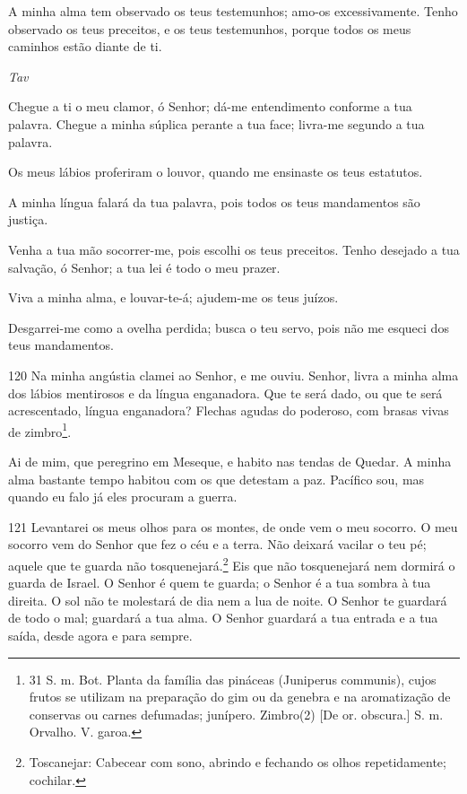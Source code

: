 A minha alma tem observado os teus testemunhos; amo-os
excessivamente. Tenho observado os teus preceitos, e os teus
testemunhos, porque todos os meus caminhos estão diante de ti.

\bigskip
\centerline{\emph{Tav}}

Chegue a ti o meu clamor, ó Senhor; dá-me entendimento conforme
a tua palavra. Chegue a minha súplica perante a tua face;
livra-me segundo a tua palavra.

Os meus lábios proferiram o louvor, quando me ensinaste os teus
estatutos.

A minha língua falará da tua palavra, pois todos os teus
mandamentos são justiça.

Venha a tua mão socorrer-me, pois escolhi os teus preceitos.
Tenho desejado a tua salvação, ó Senhor; a tua lei é todo o
meu prazer.

Viva a minha alma, e louvar-te-á; ajudem-me os teus juízos.

Desgarrei-me como a ovelha perdida; busca o teu servo, pois não
me esqueci dos teus mandamentos.

\bigskip

\lettrine{120}{} Na minha angústia clamei ao Senhor, e me ouviu.
Senhor, livra a minha alma dos lábios mentirosos e da língua
enganadora. Que te será dado, ou que te será acrescentado,
língua enganadora? Flechas agudas do poderoso, com brasas vivas
de zimbro\footnote{31 S. m. Bot. Planta da família das pináceas
(Juniperus communis), cujos frutos se utilizam na preparação do gim
ou da genebra e na aromatização de conservas ou carnes defumadas;
junípero. Zimbro(2) [De or. obscura.] S. m. Orvalho. V. garoa.}.

Ai de mim, que peregrino em Meseque, e habito nas tendas de
Quedar. A minha alma bastante tempo habitou com os que detestam
a paz. Pacífico sou, mas quando eu falo já eles procuram a
guerra.

\bigskip

\lettrine{121}{} Levantarei os meus olhos para os montes, de
onde vem o meu socorro. O meu socorro vem do Senhor que fez o
céu e a terra. Não deixará vacilar o teu pé; aquele que te
guarda não tosquenejará.\footnote{Toscanejar: Cabecear com sono,
abrindo e fechando os olhos repetidamente; cochilar.} Eis que
não tosquenejará nem dormirá o guarda de Israel. O Senhor é quem
te guarda; o Senhor é a tua sombra à tua direita. O sol não te
molestará de dia nem a lua de noite. O Senhor te guardará de
todo o mal; guardará a tua alma. O Senhor guardará a tua entrada
e a tua saída, desde agora e para sempre.

